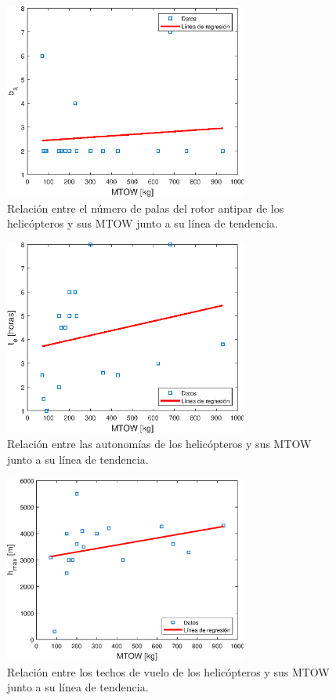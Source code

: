 \begin{figure}
	\centering
	\includegraphics[width=80mm]{graficos/analbtr}
	\caption{Relación entre el número de palas del rotor antipar de los helicópteros y sus MTOW junto a su línea de tendencia.}
	\label{baAS}
\end{figure}
\begin{figure}
	\centering
	\includegraphics[width=80mm]{graficos/analaut}
	\caption{Relación entre las autonomías de los helicópteros y sus MTOW junto a su línea de tendencia.}
	\label{autAS}
\end{figure}
\begin{figure}
	\centering
	\includegraphics[width=80mm]{graficos/analtecho}
	\caption{Relación entre los techos de vuelo de los helicópteros y sus MTOW junto a su línea de tendencia.}
	\label{techoAS}
\end{figure}
